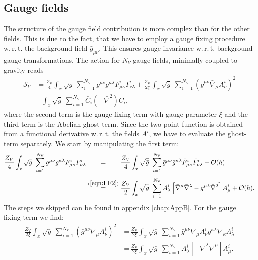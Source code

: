 \subsection{Gauge fields}  
The structure of the gauge field contribution is more complex than for the other fields. This is due to the fact, that we have to employ a gauge fixing procedure w.\,r.\,t. the background field $\bar{g}_{\mu\nu}$. This ensures gauge invariance w.\,r.\,t. background gauge transformations. The action for $N_V$ gauge fields, minimally coupled to gravity reads
\begin{equation}
\begin{aligned}
\mathcal{S}_{V} &= \frac{Z_{\text{V}}}{4}\int_x \sqrt{g} \ \sum\limits_{i=1}^{N_{\text{V}}} g^{\mu\nu}g^{\kappa\lambda}F^{i}_{\mu\kappa}F^{i}_{\nu\lambda}  
		+ \frac{Z_{\text{V}}}{2\xi}\int_x \sqrt{\bar{g}} \ \sum\limits_{i=1}^{N_{\text{V}}} \left(\bar{g}^{\mu\nu}\bar{\nabla}_{\mu}A_{\nu}^{i}\right)^2\\
		&+\int_x \sqrt{\bar{g}} \ \sum\limits_{i=1}^{N_{\text{V}}} \bar{C}_i(-\bar{\nabla}^2)C_i, 
\end{aligned}
\end{equation}
where the second term is the gauge fixing term with gauge parameter $\xi$ and the third term is the Abelian ghost term. Since the two-point function is obtained from a functional derivative w.\,r.\,t. the fields $A^{i}$, we have to evaluate the ghost-term separately. We start by manipulating the first term:
\begin{equation}
\begin{aligned}
\frac{Z_V}{4}\int_x \sqrt{g} \ \sum\limits_{i=1}^{N_{\text{V}}} g^{\mu\nu}g^{\kappa\lambda}F^{i}_{\mu\kappa}F^{i}_{\nu\lambda} &\overset{\phantom{(\mathrm{\ref{eqn:FF2}})}}{=}  \frac{Z_{V}}{4} \int_x \sqrt{\bar{g}} \ \sum\limits_{i=1}^{N_{\text{V}}} \bar{g}^{\mu\nu}\bar{g}^{\kappa\lambda}\bar{F}^{i}_{\mu\kappa}\bar{F}^{i}_{\nu\lambda} + \mathcal{O}(h) \\[5pt]
&\overset{(\mathrm{\ref{eqn:FF2}})}{=} \frac{Z_{V}}{2} \int_x \sqrt{\bar{g}} \ \sum\limits_{i=1}^{N_{\text{V}}} A_{\lambda}^{i}\left[ \bar{\nabla}^{\mu}\bar{\nabla}^{\lambda} - \bar{g}^{\mu\lambda}\bar{\nabla}^2\right]A_{\mu}^{i} + \mathcal{O}(h).
\end{aligned}
\end{equation}
The steps we skipped can be found in appendix \ref{chap:AppB}. For the gauge fixing term we find:
\begin{equation}
\begin{aligned}
\frac{Z_{\text{V}}}{2\xi}\int_x \sqrt{\bar{g}} \ \sum\limits_{i=1}^{N_{\text{V}}} \left(\bar{g}^{\mu\nu}\bar{\nabla}_{\mu}A_{\nu}^{i}\right)^2 
	&= \frac{Z_{\text{V}}}{2\xi}\int_x \sqrt{\bar{g}} \ \sum\limits_{i=1}^{N_{\text{V}}} \bar{g}^{\mu\nu}\bar{\nabla}_{\mu}A_{\nu}^{i}g^{\kappa\lambda}\bar{\nabla}_{\kappa}A_{\lambda}^{i} \\[5pt]
	&= \frac{Z_{\text{V}}}{2\xi}\int_x \sqrt{\bar{g}} \ \sum\limits_{i=1}^{N_{\text{V}}} A_{\lambda}^{i}\left[-\bar{\nabla}^{\lambda}\bar{\nabla}^{\mu}\right]A_{\mu}^{i}. 
\end{aligned}	
\end{equation}

